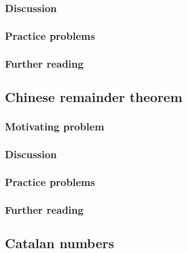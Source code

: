 
\subsubsection*{Discussion}

\subsubsection*{Practice problems}

\subsubsection*{Further reading}

\subsection{Chinese remainder theorem}

\subsubsection*{Motivating problem}







\subsubsection*{Discussion}

\subsubsection*{Practice problems}

\subsubsection*{Further reading}

\subsection{Catalan numbers}


